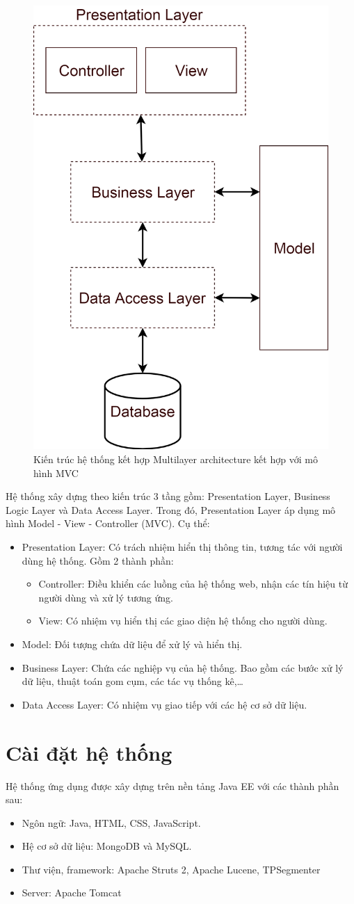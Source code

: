 	\begin{figure}[H]
		\centering
		\includegraphics[width=0.5\linewidth]{Chapter3/Chapter3Figs/Layers}
		\caption{Kiến trúc hệ thống kết hợp Multilayer architecture kết hợp với mô hình MVC}
		\label{fig:layers}
	\end{figure}
Hệ thống xây dựng theo kiến trúc 3 tầng gồm: Presentation Layer, Business Logic Layer và Data Access Layer. Trong đó, Presentation Layer áp dụng mô hình Model - View - Controller (MVC). Cụ thể:
	\begin{itemize}
		\item Presentation Layer: Có trách nhiệm hiển thị thông tin, tương tác với người dùng hệ thống. Gồm 2 thành phần:
			\begin{itemize}
				\item Controller: Điều khiển các luồng của hệ thống web, nhận các tín hiệu từ người dùng và xử lý tương ứng.
				\item View: Có nhiệm vụ hiển thị các giao diện hệ thống cho người dùng.
			\end{itemize}
		\item Model: Đối tượng chứa dữ liệu để xử lý và hiển thị.
		\item Business Layer: Chứa các nghiệp vụ của hệ thống. Bao gồm các bước xử lý dữ liệu, thuật toán gom cụm, các tác vụ thống kê,…
		\item Data Access Layer: Có nhiệm vụ giao tiếp với các hệ cơ sở dữ liệu.
	\end{itemize}

\section{Cài đặt hệ thống}%
Hệ thống ứng dụng được xây dựng trên nền tảng Java EE với các thành phần sau:
	\begin{itemize}
		\item Ngôn ngữ: Java, HTML, CSS, JavaScript.
		\item Hệ cơ sở dữ liệu: MongoDB và MySQL.
		\item Thư viện, framework: Apache Struts 2, Apache Lucene, TPSegmenter
		\item Server: Apache Tomcat
	\end{itemize}

